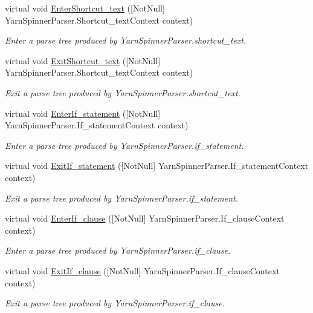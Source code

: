 \begin{DoxyCompactItemize}
virtual void \hyperlink{a00196_a4d7217dafbfae9f55eefe72a1a5e86f7}{Enter\-Shortcut\-\_\-text} (\mbox{[}Not\-Null\mbox{]} Yarn\-Spinner\-Parser.\-Shortcut\-\_\-text\-Context context)
\begin{DoxyCompactList}\small\item\em Enter a parse tree produced by Yarn\-Spinner\-Parser.\-shortcut\-\_\-text. \end{DoxyCompactList}\item 
virtual void \hyperlink{a00196_a26bb6f162b0375a1455013d85dff2ddb}{Exit\-Shortcut\-\_\-text} (\mbox{[}Not\-Null\mbox{]} Yarn\-Spinner\-Parser.\-Shortcut\-\_\-text\-Context context)
\begin{DoxyCompactList}\small\item\em Exit a parse tree produced by Yarn\-Spinner\-Parser.\-shortcut\-\_\-text. \end{DoxyCompactList}\item 
virtual void \hyperlink{a00196_a6a48fc449efd199d13ecacd410b815ad}{Enter\-If\-\_\-statement} (\mbox{[}Not\-Null\mbox{]} Yarn\-Spinner\-Parser.\-If\-\_\-statement\-Context context)
\begin{DoxyCompactList}\small\item\em Enter a parse tree produced by Yarn\-Spinner\-Parser.\-if\-\_\-statement. \end{DoxyCompactList}\item 
virtual void \hyperlink{a00196_ac9b0ce9a61afd12bc631e834adc38893}{Exit\-If\-\_\-statement} (\mbox{[}Not\-Null\mbox{]} Yarn\-Spinner\-Parser.\-If\-\_\-statement\-Context context)
\begin{DoxyCompactList}\small\item\em Exit a parse tree produced by Yarn\-Spinner\-Parser.\-if\-\_\-statement. \end{DoxyCompactList}\item 
virtual void \hyperlink{a00196_a94adce014a20de8b1a4b82b50d3e3036}{Enter\-If\-\_\-clause} (\mbox{[}Not\-Null\mbox{]} Yarn\-Spinner\-Parser.\-If\-\_\-clause\-Context context)
\begin{DoxyCompactList}\small\item\em Enter a parse tree produced by Yarn\-Spinner\-Parser.\-if\-\_\-clause. \end{DoxyCompactList}\item 
virtual void \hyperlink{a00196_ab9705313017584f8f466e481ae4cdcfc}{Exit\-If\-\_\-clause} (\mbox{[}Not\-Null\mbox{]} Yarn\-Spinner\-Parser.\-If\-\_\-clause\-Context context)
\begin{DoxyCompactList}\small\item\em Exit a parse tree produced by Yarn\-Spinner\-Parser.\-if\-\_\-clause. \end{DoxyCompactList}\item 

\end{DoxyCompactItemize}
